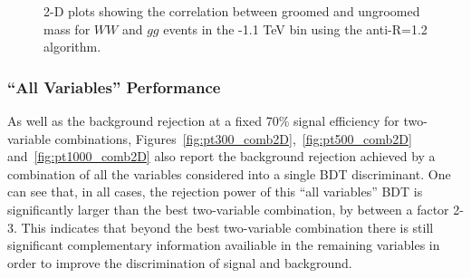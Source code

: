 \begin{figure}
\begin{center}
\caption{2-D plots showing the correlation between groomed and
  ungroomed mass for $WW$ and $gg$ events in the -1.1 TeV bin using the
  anti-\kT R=1.2 algorithm.}
\label{fig:pt1000_2d_masses_AKt_R12}
\end{center}
\end{figure}

\subsubsection{``All Variables'' Performance}

As well as the background rejection at a fixed 70\% signal efficiency
for two-variable combinations, Figures~\ref{fig:pt300_comb2D},~\ref{fig:pt500_comb2D}
and~\ref{fig:pt1000_comb2D} also report the background rejection
achieved by a combination of all the variables considered into a
single BDT discriminant. One can see that, in all cases, the rejection
power of this ``all variables'' BDT is significantly larger than the
best two-variable combination, by between a factor 2-3. This indicates
that beyond the best two-variable combination there is still
significant complementary information availiable in the remaining
variables in order to improve the discrimination of signal and background.


